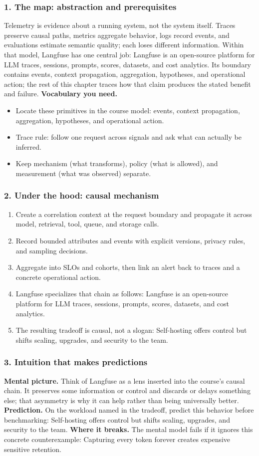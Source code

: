 \subsubsection*{1. The map: abstraction and prerequisites}
Telemetry is evidence about a running system, not the system itself. Traces preserve causal paths, metrics aggregate behavior, logs record events, and evaluations estimate semantic quality; each loses different information.
Within that model, Langfuse has one central job: Langfuse is an open-source platform for LLM traces, sessions, prompts, scores, datasets, and cost analytics. Its boundary contains events, context propagation, aggregation, hypotheses, and operational action; the rest of this chapter traces how that claim produces the stated benefit and failure.
\textbf{Vocabulary you need.}\begin{itemize}
\item Locate these primitives in the course model: events, context propagation, aggregation, hypotheses, and operational action.
\item Trace rule: follow one request across signals and ask what can actually be inferred.
\item Keep mechanism (what transforms), policy (what is allowed), and measurement (what was observed) separate.
\end{itemize}
\subsubsection*{2. Under the hood: causal mechanism}\begin{enumerate}
\item Create a correlation context at the request boundary and propagate it across model, retrieval, tool, queue, and storage calls.
\item Record bounded attributes and events with explicit versions, privacy rules, and sampling decisions.
\item Aggregate into SLOs and cohorts, then link an alert back to traces and a concrete operational action.
\item Langfuse specializes that chain as follows: Langfuse is an open-source platform for LLM traces, sessions, prompts, scores, datasets, and cost analytics.
\item The resulting tradeoff is causal, not a slogan: Self-hosting offers control but shifts scaling, upgrades, and security to the team.
\end{enumerate}
\subsubsection*{3. Intuition that makes predictions}
\textbf{Mental picture.} Think of Langfuse as a lens inserted into the course's causal chain. It preserves some information or control and discards or delays something else; that asymmetry is why it can help rather than being universally better.
\textbf{Prediction.} On the workload named in the tradeoff, predict this behavior before benchmarking: Self-hosting offers control but shifts scaling, upgrades, and security to the team.
\textbf{Where it breaks.} The mental model fails if it ignores this concrete counterexample: Capturing every token forever creates expensive sensitive retention.
